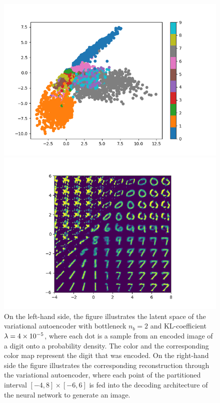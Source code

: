 \begin{figure}
\begin{center}
   \begin{minipage}[b]{0.49\linewidth}
      \includegraphics[trim = 10mm 5mm 15mm 10mm, clip, width=\linewidth]{convolutional_VAE_snd_KL_4e-5_10k_epochs_2D_latent}
	\end{minipage}
   \begin{minipage}[b]{0.49\linewidth}
      \includegraphics[trim = 15mm 5mm 15mm 10mm, clip, width=\linewidth]{convolutional_VAE_snd_KL_4e-5_10k_epochs_2D_reconstruction}
	\end{minipage}
\end{center}
\caption{On the left-hand side, the figure illustrates the latent space of the variational autoencoder with bottleneck $n_b=2$ and KL-coefficient $\lambda = \num{4e-5}$, where each dot is a sample from an encoded image of a digit onto a probability density. The color and the corresponding color map represent the digit that was encoded. On the right-hand side the figure illustrates the corresponding reconstruction through the variational autoencoder, where each point of the partitioned  interval $[-4, 8]\times [-6, 6]$ is fed into the decoding architecture of the neural network to generate an image.}\label{fig:convolutional_VAE_snd_KL_4e-5_10k_epochs_2D}
\end{figure}


